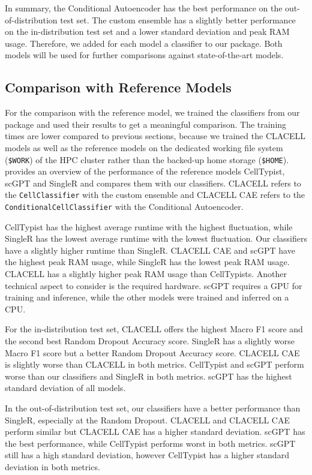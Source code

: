 \documentclass[11pt]{article}
\begin{document}
In summary, the Conditional Autoencoder has the best performance on the out-of-distribution test set. The custom ensemble has a slightly better performance on the in-distribution test set and a lower standard deviation and peak RAM usage. Therefore, we added for each model a classifier to our package. Both models will be used for further comparisons against state-of-the-art models.


\FloatBarrier
\subsection{Comparison with Reference Models}\label{sec:results:reference-models}

For the comparison with the reference model, we trained the classifiers from our package and used their results to get a meaningful comparison. The training times are lower compared to previous sections, because we trained the CLACELL models as well as the reference models on the dedicated working file system (\texttt{\$WORK}) of the HPC cluster rather than the backed-up home storage (\texttt{\$HOME}).
 provides an overview of the performance of the reference models CellTypist, scGPT and SingleR and compares them with our classifiers. CLACELL refers to the \texttt{CellClassifier} with the custom ensemble and CLACELL CAE refers to the \texttt{ConditionalCellClassifier} with the Conditional Autoencoder.

CellTypist has the highest average runtime with the highest fluctuation, while SingleR has the lowest average runtime with the lowest fluctuation. Our classifiers have a slightly higher runtime than SingleR. CLACELL CAE and scGPT have the highest peak RAM usage, while SingleR has the lowest peak RAM usage. CLACELL has a slightly higher peak RAM usage than CellTypists. Another technical aspect to consider is the required hardware. scGPT requires a GPU for training and inference, while the other models were trained and inferred on a CPU.

For the in-distribution test set, CLACELL offers the highest Macro F1 score and the second best Random Dropout Accuracy score. SingleR has a slightly worse Macro F1 score but a better Random Dropout Accuracy score. CLACELL CAE is slightly worse than CLACELL in both metrics. CellTypist and scGPT perform worse than our classifiers and SingleR in both metrics. scGPT has the highest standard deviation of all models.

In the out-of-distribution test set, our classifiers have a better performance than SingleR, especially at the Random Dropout. CLACELL and CLACELL CAE perform similar but CLACELL CAE has a higher standard deviation. scGPT has the best performance, while CellTypist performs worst in both metrics. scGPT still has a high standard deviation, however CellTypist has a higher standard deviation in both metrics.
\end{document}

